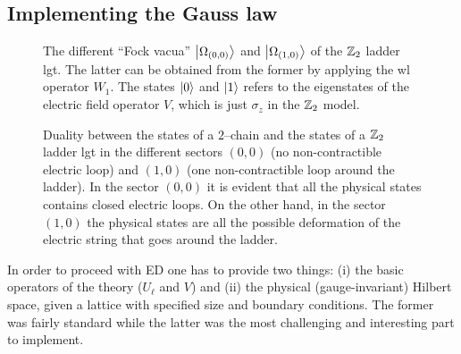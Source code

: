 %
%

\subsection{Implementing the Gauss law}%
\label{sub:implementing_the_gauss_law}

\begin{figure}[t]
    \centering
    
    \caption[Vacuum states of the super-selection sectors of the $\Z_2$ ladder \ac{lgt}]{The different ``Fock vacua'' $\ket{\Omega_{(0,0)}}$ and $\ket{\Omega_{(1,0)}}$ of the $\Z_2$ ladder \ac{lgt}.
        The latter can be obtained from the former by applying the \ac{wl} operator $W_1$.
        The states $\ket{0}$ and $\ket{1}$ refers to the eigenstates of the electric field operator $V$, which is just $\sigma_{z}$ in the $\Z_2$ model.
    }
    \label{fig:z2_vacua}
\end{figure}

\begin{figure}
    \centering
    
    \caption[Duality between clock states and ladder states]{Duality between the states of a $2$--chain and the states of a $\Z_2$ ladder \ac{lgt} in the different sectors $(0,0)$ (no non-contractible electric loop) and $(1,0)$ (one non-contractible loop around the ladder).
        In the sector $(0,0)$ it is evident that all the physical states contains closed electric loops.
        On the other hand, in the sector $(1,0)$ the physical states are all the possible deformation of the electric string that goes around the ladder.}
    \label{fig:z2_states}
\end{figure}

In order to proceed with ED one has to provide two things: (i) the basic operators of the theory ($U_{\ell}$ and $V$) and (ii) the physical (gauge-invariant) Hilbert space, given a lattice with specified size and boundary conditions.
The former was fairly standard while the latter was the most challenging and interesting part to implement.

